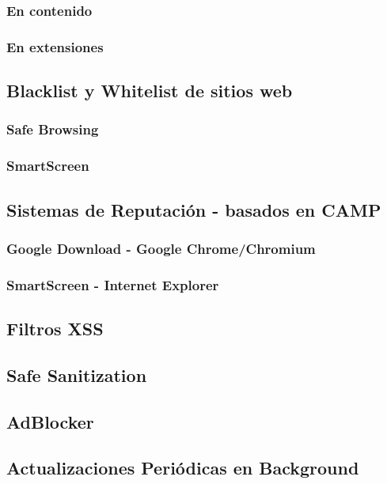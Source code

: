  	\subsubsection{En contenido}

 	\subsubsection{En extensiones}

 \subsection{Blacklist y Whitelist de sitios web}
 	\subsubsection{Safe Browsing}
 	\subsubsection{SmartScreen}

 \subsection{Sistemas de Reputación - basados en CAMP}
 	\subsubsection{Google Download - Google Chrome/Chromium}
 	\subsubsection{SmartScreen - Internet Explorer}

 \subsection{Filtros XSS}
 \subsection{Safe Sanitization}

 \subsection{AdBlocker}

 \subsection{Actualizaciones Periódicas en Background}


 
